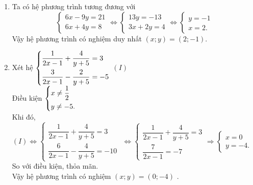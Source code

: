 \begin{bt}
{\begin{enumerate}
			\item Ta có hệ phương trình tương đương với $$\begin{cases}
			6x-9y = 21 \\
			6x + 4y = 8 
			\end{cases}
			\Leftrightarrow 
			\begin{cases}
			13y=-13 \\
			3x + 2y = 4 
			\end{cases}
			\Leftrightarrow 
			\begin{cases}
			y=-1 \\
			x = 2. 
			\end{cases}$$
			Vậy hệ phương trình có nghiệm duy nhất $(x; y)=\left(2; -1\right)$.
			\item Xét hệ
			$\left\{\begin{aligned}&\dfrac{1}{2x - 1} + \dfrac{4}{y + 5} = 3\\
				&\dfrac{3}{2x - 1} - \dfrac{2}{y + 5} =  - 5\end{aligned}\right.$ $(I)$\\
			Điều kiện $\left\{\begin{aligned}&x \ne \dfrac{1}{2}\\&y \ne  - 5.\end{aligned}\right.$\\
			Khi đó, $\left( I \right) \Leftrightarrow \left\{ \begin{array}{l}
			\dfrac{1}{2x - 1} + \dfrac{4}{y + 5} = 3\\
			\dfrac{6}{2x - 1} - \dfrac{4}{y + 5} =  - 10
			\end{array} \right.\,\, \Leftrightarrow \left\{ \begin{array}{l}
			\dfrac{1}{2x - 1} + \dfrac{4}{y + 5} = 3\\
			\dfrac{7}{2x - 1} =  - 7
			\end{array} \right. \Rightarrow \left\{ \begin{array}{l}
			x = 0\\
			y =  - 4.
			\end{array} \right.$\\
			So với điều kiện, thỏa mãn.\\
			Vậy hệ phương trình có nghiệm $(x;y)=(0;-4)$ .
		\end{enumerate}
	}
\end{bt}

